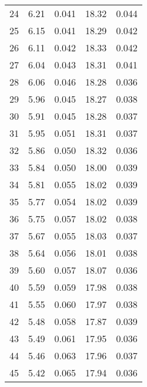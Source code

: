 \begin{table}
\begin{tabular}{c|ll|ll}
24 & 6.21 & 0.041 & 18.32 & 0.044 \\
25 & 6.15 & 0.041 & 18.29 & 0.042 \\
26 & 6.11 & 0.042 & 18.33 & 0.042 \\
27 & 6.04 & 0.043 & 18.31 & 0.041 \\
28 & 6.06 & 0.046 & 18.28 & 0.036 \\
29 & 5.96 & 0.045 & 18.27 & 0.038 \\
30 & 5.91 & 0.045 & 18.28 & 0.037 \\
31 & 5.95 & 0.051 & 18.31 & 0.037 \\
32 & 5.86 & 0.050 & 18.32 & 0.036 \\
33 & 5.84 & 0.050 & 18.00 & 0.039 \\
34 & 5.81 & 0.055 & 18.02 & 0.039 \\
35 & 5.77 & 0.054 & 18.02 & 0.039 \\
36 & 5.75 & 0.057 & 18.02 & 0.038 \\
37 & 5.67 & 0.055 & 18.03 & 0.037 \\
38 & 5.64 & 0.056 & 18.01 & 0.038 \\
39 & 5.60 & 0.057 & 18.07 & 0.036 \\
40 & 5.59 & 0.059 & 17.98 & 0.038 \\
41 & 5.55 & 0.060 & 17.97 & 0.038 \\
42 & 5.48 & 0.058 & 17.87 & 0.039 \\
43 & 5.49 & 0.061 & 17.95 & 0.036 \\
44 & 5.46 & 0.063 & 17.96 & 0.037 \\
45 & 5.42 & 0.065 & 17.94 & 0.036 \\
               \hline
        \end{tabular}
    \end{table}
    \clearpage

